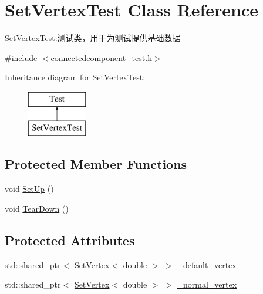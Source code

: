 \hypertarget{class_set_vertex_test}{}\section{Set\+Vertex\+Test Class Reference}
\label{class_set_vertex_test}


\hyperlink{class_set_vertex_test}{Set\+Vertex\+Test}\+:测试类，用于为测试提供基础数据  




{\ttfamily \#include $<$connectedcomponent\+\_\+test.\+h$>$}

Inheritance diagram for Set\+Vertex\+Test\+:\begin{figure}[H]
\begin{center}
\leavevmode
\includegraphics[height=2.000000cm]{class_set_vertex_test}
\end{center}
\end{figure}
\subsection*{Protected Member Functions}
\begin{DoxyCompactItemize}
\item 
void \hyperlink{class_set_vertex_test_a69651499454a1fea72d3ec2c4c1db15c}{Set\+Up} ()
\item 
void \hyperlink{class_set_vertex_test_a0c1de08f51a7ce42aa7cdc321715afaa}{Tear\+Down} ()
\end{DoxyCompactItemize}
\subsection*{Protected Attributes}
\begin{DoxyCompactItemize}
\item 
std\+::shared\+\_\+ptr$<$ \hyperlink{struct_introduction_to_algorithm_1_1_graph_algorithm_1_1_set_vertex}{Set\+Vertex}$<$ double $>$ $>$ \hyperlink{class_set_vertex_test_a886fbbe6fd5a4e4c954f2ff38951f90b}{\+\_\+default\+\_\+vertex}
\item 
std\+::shared\+\_\+ptr$<$ \hyperlink{struct_introduction_to_algorithm_1_1_graph_algorithm_1_1_set_vertex}{Set\+Vertex}$<$ double $>$ $>$ \hyperlink{class_set_vertex_test_af78af1aa633b65214ed39e8956beee39}{\+\_\+normal\+\_\+vertex}
\end{DoxyCompactItemize}


